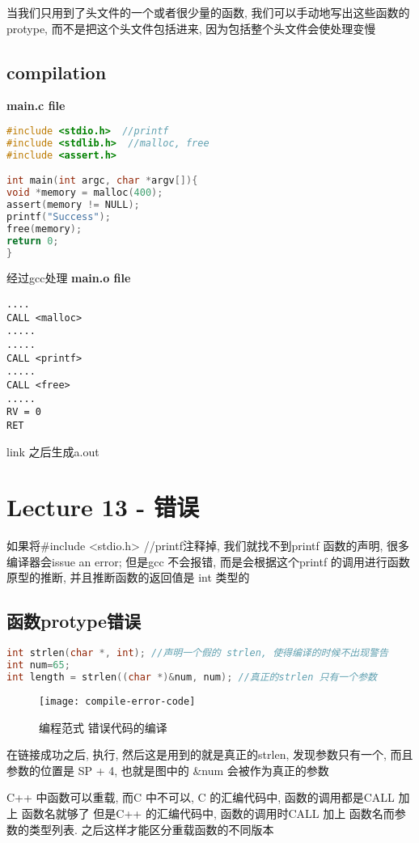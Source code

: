 \documentclass{article}
\begin{document}
当我们只用到了头文件的一个或者很少量的函数, 我们可以手动地写出这些函数的protype, 而不是把这个头文件包括进来, 因为包括整个头文件会使处理变慢

\subsection{compilation}
\textbf{main.c file}\\
\begin{lstlisting}[language = C]
#include <stdio.h>  //printf
#include <stdlib.h>  //malloc, free
#include <assert.h>

int main(int argc, char *argv[]){
void *memory = malloc(400);
assert(memory != NULL);
printf("Success");
free(memory);
return 0;
}
\end{lstlisting}

经过gcc处理
\textbf{main.o file}
\begin{verbatim}
....
CALL <malloc>
.....
.....
CALL <printf>
.....
CALL <free>
.....
RV = 0
RET
\end{verbatim}
link 之后生成a.out

\section{Lecture 13 - 错误}
如果将\#include <stdio.h>  //printf注释掉, 我们就找不到printf 函数的声明, 很多编译器会issue an error; 但是gcc 不会报错, 而是会根据这个printf 的调用进行函数原型的推断, 并且推断函数的返回值是 int 类型的

\subsection{函数protype错误}
\begin{lstlisting}[language = C]
int strlen(char *, int); //声明一个假的 strlen, 使得编译的时候不出现警告
int num=65;
int length = strlen((char *)&num, num); //真正的strlen 只有一个参数
\end{lstlisting}
\begin{figure}[htbp]
	\centering
	\texttt{[image: compile-error-code]}\\
	\caption{编程范式 错误代码的编译}\label{fig.compile-error-code}
\end{figure}

在链接成功之后, 执行, 然后这是用到的就是真正的strlen, 发现参数只有一个, 而且参数的位置是
SP + 4, 也就是图中的 \&num 会被作为真正的参数

C++ 中函数可以重载, 而C 中不可以,
C 的汇编代码中, 函数的调用都是CALL 加上 函数名就够了
但是C++ 的汇编代码中, 函数的调用时CALL 加上 函数名而参数的类型列表. 之后这样才能区分重载函数的不同版本
\end{document}
